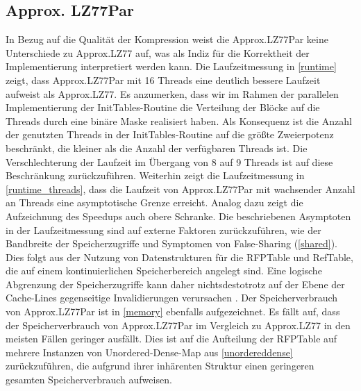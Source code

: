 \subsection{Approx. LZ77Par}
In Bezug auf die Qualität der Kompression weist die Approx.LZ77Par keine Unterschiede zu Approx.LZ77 auf, was als Indiz für die Korrektheit der Implementierung
interpretiert werden kann. Die Laufzeitmessung in \ref{runtime} zeigt, dass Approx.LZ77Par mit 16 Threads eine deutlich bessere Laufzeit aufweist als Approx.LZ77.
Es anzumerken, dass wir im Rahmen der parallelen Implementierung der InitTables-Routine die Verteilung der Blöcke auf die Threads durch eine binäre Maske realisiert haben.
Als Konsequenz ist die Anzahl der genutzten Threads in der InitTables-Routine auf die größte Zweierpotenz beschränkt, die kleiner als die Anzahl der verfügbaren Threads ist.
Die Verschlechterung der Laufzeit im Übergang von 8 auf 9 Threads ist auf diese Beschränkung zurückzuführen. Weiterhin zeigt die Laufzeitmessung in \ref{runtime_threads},
dass die Laufzeit von Approx.LZ77Par mit wachsender Anzahl an Threads eine asymptotische Grenze erreicht. Analog dazu zeigt die Aufzeichnung des Speedups auch
obere Schranke. Die beschriebenen Asymptoten in der Laufzeitmessung sind auf externe Faktoren zurückzuführen, wie der Bandbreite der Speicherzugriffe und Symptomen von 
False-Sharing (\ref{shared}). Dies folgt aus der Nutzung von Datenstrukturen für die RFPTable und RefTable, die auf einem kontinuierlichen Speicherbereich angelegt sind.
Eine logische Abgrenzung der Speicherzugriffe kann daher nichtsdestotrotz auf der Ebene der Cache-Lines gegenseitige Invalidierungen verursachen \cite{mccool}.
Der Speicherverbrauch von Approx.LZ77Par ist in \ref{memory} ebenfalls aufgezeichnet. Es fällt auf, dass der Speicherverbrauch von Approx.LZ77Par im Vergleich zu Approx.LZ77 
in den meisten Fällen geringer ausfällt. Dies ist auf die Aufteilung der RFPTable auf mehrere Instanzen von Unordered-Dense-Map aus \ref{unordereddense} zurückzuführen, die 
aufgrund ihrer inhärenten Struktur einen geringeren gesamten Speicherverbrauch aufweisen.